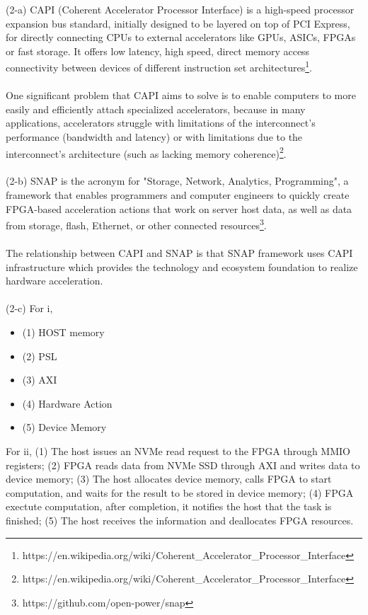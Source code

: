 \documentclass[11pt]{article}
\begin{document}
\begin{solution}
\begin{itemize}
\end{itemize}
(2-a) CAPI (Coherent Accelerator Processor Interface) is a high-speed processor expansion bus standard, initially designed to be layered on top of PCI Express, for directly connecting CPUs to external accelerators like GPUs, ASICs, FPGAs or fast storage. It offers low latency, high speed, direct memory access connectivity between devices of different instruction set architectures\footnote{https://en.wikipedia.org/wiki/Coherent\_Accelerator\_Processor\_Interface}.
\\
\\
One significant problem that CAPI aims to solve is to enable computers to more easily and efficiently attach specialized accelerators, because in many applications, accelerators struggle with limitations of the interconnect's performance (bandwidth and latency) or with limitations due to the interconnect's architecture (such as lacking memory coherence)\footnote{https://en.wikipedia.org/wiki/Coherent\_Accelerator\_Processor\_Interface}.
\\
\\
(2-b) SNAP is the acronym for "Storage, Network, Analytics, Programming",  a framework that enables programmers and computer engineers to quickly create FPGA-based acceleration actions that work on server host data, as well as data from storage, flash, Ethernet, or other connected resources\footnote{https://github.com/open-power/snap}. 
\\
\\
The relationship between CAPI and SNAP is that SNAP framework uses CAPI infrastructure which provides the technology and ecosystem foundation to realize hardware acceleration.
\\
\\
(2-c) For i, 
\begin{itemize}
\item (1) HOST memory
\item (2) PSL
\item (3) AXI
\item (4) Hardware Action
\item (5) Device Memory
\end{itemize}
For ii, (1) The host issues an NVMe read request to the FPGA through MMIO registers; (2) FPGA reads data from NVMe SSD through AXI and writes data to device memory; (3) The host allocates device memory, calls FPGA to start computation, and waits for the result to be stored in device memory; (4) FPGA exectute computation, after completion, it notifies the host that the task is finished; (5) The host receives the information and deallocates FPGA resources. 
\end{solution}
\end{document}
